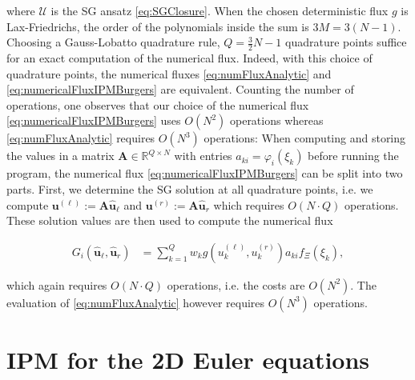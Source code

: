 where $\mathcal{U}$ is the SG ansatz \eqref{eq:SGClosure}. When the chosen deterministic flux $g$ is Lax-Friedrichs, the order of the polynomials inside the sum is $3M=3(N-1)$. Choosing a Gauss-Lobatto quadrature rule, $Q = \frac32 N -1$ quadrature points suffice for an exact computation of the numerical flux. Indeed, with this choice of quadrature points, the numerical fluxes \eqref{eq:numFluxAnalytic} and \eqref{eq:numericalFluxIPMBurgers} are equivalent. 
Counting the number of operations, one observes that our choice of the numerical flux \eqref{eq:numericalFluxIPMBurgers} uses $O(N^2)$ operations whereas \eqref{eq:numFluxAnalytic} requires $O(N^3)$ operations: When computing and storing the values in a matrix $\bm A\in\mathbb{R}^{Q\times N}$ with entries $a_{ki} = \varphi_i(\xi_k)$ before running the program, the numerical flux \eqref{eq:numericalFluxIPMBurgers} can be split into two parts. First, we determine the SG solution at all quadrature points, i.e. we compute $\bm{u}^{(\ell)} := \bm A \bm{\hat u}_{\ell}$ and $\bm{u}^{(r)} := \bm A \bm{\hat u}_{r}$ which requires $O(N\cdot Q)$ operations. These solution values are then used to compute the numerical flux
\begin{linenomath*}\begin{align*}
G_i(\bm{\hat u}_{\ell},\bm{\hat u}_{r}) &= \sum_{k=1}^Q w_k g(u^{(\ell)}_k,u^{(r)}_k)a_{ki}f_{\Xi}(\xi_k),
\end{align*}\end{linenomath*}
which again requires $O(N\cdot Q)$ operations, i.e. the costs are $O(N^2)$. The evaluation of \eqref{eq:numFluxAnalytic} however requires $O(N^3)$ operations.

\section{IPM for the 2D Euler equations}
\label{app:IPM2DEuler}

